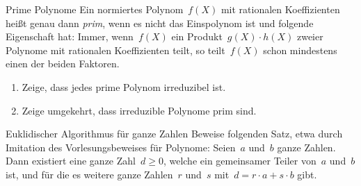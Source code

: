\documentclass{algblatt}
\begin{document}
\begin{aufgabe}{Prime Polynome}
Ein normiertes Polynom~$f(X)$ mit rationalen Koeffizienten heißt genau
dann \emph{prim}, wenn es nicht das Einspolynom ist und folgende Eigenschaft
hat: Immer, wenn~$f(X)$ ein Produkt~$g(X) \cdot h(X)$ zweier Polynome mit
rationalen Koeffizienten teilt, so teilt~$f(X)$ schon mindestens einen der
beiden Faktoren.
\begin{enumerate}
\item Zeige, dass jedes prime Polynom irreduzibel ist.
\item Zeige umgekehrt, dass irreduzible Polynome prim sind.
\end{enumerate}
\end{aufgabe}

\begin{aufgabe}{Euklidischer Algorithmus für ganze Zahlen}
Beweise folgenden Satz, etwa durch Imitation des Vorlesungsbeweises für
Polynome: Seien~$a$ und~$b$ ganze Zahlen. Dann existiert eine ganze Zahl~$d
\geq 0$, welche ein gemeinsamer Teiler von~$a$ und~$b$ ist, und für die es
weitere ganze Zahlen~$r$ und~$s$ mit~$d = r \cdot a + s \cdot b$ gibt.
\end{aufgabe}
 
\end{document}
